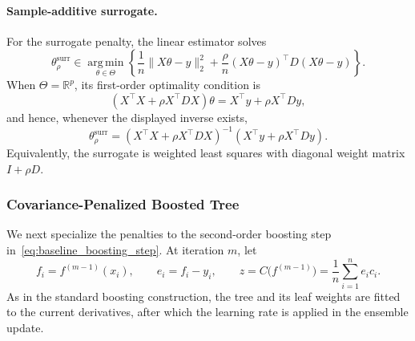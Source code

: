 \documentclass[10pt]{article}
\theoremstyle{definition}
\newcommand{\1}{\mathbf{1}}
\newcommand{\argminop}{\operatorname*{arg\,min}}
\begin{document}
{{{\paragraph{Sample-additive surrogate.}
For the surrogate penalty, the linear estimator solves
\begin{equation}
\label{eq:linear_surrogate_problem}
\theta_\rho^{\mathrm{surr}}
\in
\argminop_{\theta\in\Theta}
\left\{
\frac{1}{n}\lVert X\theta-y\rVert_2^2
+
\frac{\rho}{n}(X\theta-y)^\top D(X\theta-y)
\right\}.
\end{equation}
When \(\Theta=\mathbb R^p\), its first-order optimality condition is
\begin{equation}
\label{eq:linear_surrogate_normal_equations}
\left(X^\top X+\rho X^\top D X\right)\theta
=
X^\top y+\rho X^\top D y,
\end{equation}
and hence, whenever the displayed inverse exists,
\begin{equation}
\label{eq:linear_surrogate_closed_form}
\theta_\rho^{\mathrm{surr}}
=
\left(X^\top X+\rho X^\top D X\right)^{-1}
\left(X^\top y+\rho X^\top D y\right).
\end{equation}
Equivalently, the surrogate is weighted least squares with diagonal weight matrix \(I+\rho D\).


\subsubsection{Covariance-Penalized Boosted Tree}
\label{subsubsec:covariance_tree_boosting}

We next specialize the penalties to the second-order boosting step in~\eqref{eq:baseline_boosting_step}. At iteration \(m\), let
\[
f_i=f^{(m-1)}(x_i),
\qquad
e_i=f_i-y_i,
\qquad
z=C\bigl(f^{(m-1)}\bigr)
=
\frac{1}{n}\sum_{i=1}^n e_i c_i.
\]
As in the standard boosting construction, the tree and its leaf weights are fitted to the current derivatives, after which the learning rate is applied in the ensemble update.

}}}
\end{document}
